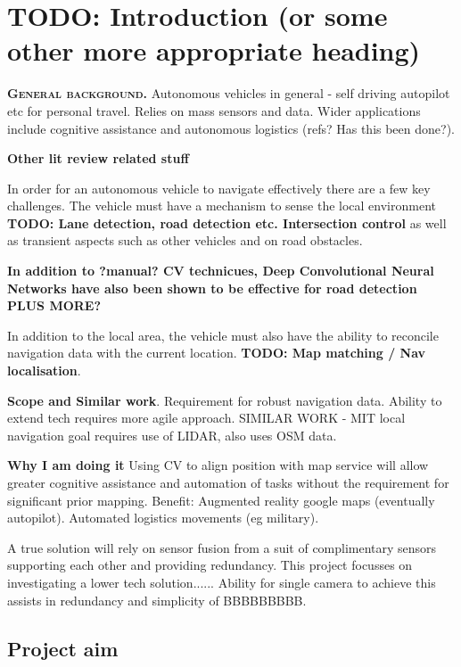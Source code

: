 \documentclass[]{aiaa-tc}%
\begin{document}
\newpage
\section{TODO: Introduction (or some other more appropriate heading)} \label{sect:intro}


\lettrine[nindent=0pt]{\textbf{G}}{\textbf{eneral background.}} Autonomous vehicles in general - self driving autopilot etc for personal travel. Relies on mass sensors and data. Wider applications include cognitive assistance and autonomous logistics (refs? Has this been done?). 

\textbf{Other lit review related stuff}

In order for an autonomous vehicle to navigate effectively there are a few key challenges. The vehicle must have a mechanism to sense the local environment \textbf{TODO: Lane detection, road detection etc. Intersection control} as well as transient aspects such as other vehicles and on road obstacles.

\textbf{In addition to ?manual? CV technicues, Deep Convolutional Neural Networks have also been shown to be effective for road detection \citep{deepRoadSegmentation} PLUS MORE? }


In addition to the local area, the vehicle must also have the ability to reconcile navigation data with the current location. \textbf{TODO: Map matching / Nav localisation}.

\textbf{Scope and Similar work}. Requirement for robust navigation data. Ability to extend tech requires more agile approach. SIMILAR WORK - MIT local navigation goal \citep{mitLocalNavDriving} requires use of LIDAR, also uses OSM data. 

\textbf{Why I am doing it }
Using CV to align position with map service will allow greater cognitive assistance and automation of tasks without the requirement for significant prior mapping. Benefit: Augmented reality google maps (eventually autopilot). Automated logistics movements (eg military).

A true solution will rely on sensor fusion from a suit of complimentary sensors supporting each other and providing redundancy. This project focusses on investigating a lower tech solution...... Ability for single camera to achieve this assists in redundancy and simplicity of BBBBBBBBB.

\subsection{Project aim}
\end{document}
